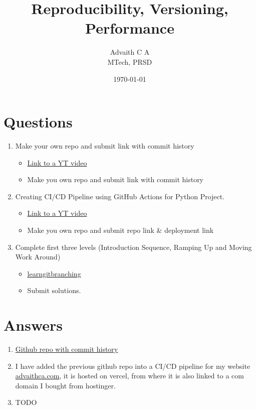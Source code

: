 \documentclass{article}
\title{Reproducibility, Versioning, Performance}
\author{Advaith C A \\MTech, PRSD}
\date{\today}
\begin{document}
    \maketitle
    \section*{Questions}
    \begin{enumerate}
        \item Make your own repo and submit link with commit history
        \begin{itemize}
            \item \href{https://www.youtube.com/watch?v=8Dd7KRpKeaE}{Link to a YT video}
            \item Make you own repo and submit link with commit history
        \end{itemize}
        \item Creating CI/CD Pipeline using GitHub Actions for Python Project.
        \begin{itemize}
            \item \href{https://www.youtube.com/watch?v=WTofttoD2xg}{Link to a YT video}
            \item Make you own repo and submit repo link \& deployment link
        \end{itemize}
        \item Complete first three levels (Introduction Sequence, Ramping Up and Moving Work Around)
        \begin{itemize}
            \item \href{https://learngitbranching.js.org/}{learngitbranching}
            \item Submit solutions.
        \end{itemize}
    \end{enumerate}

    \section*{Answers}
    \begin{enumerate}
        \item \href{https://github.com/advaithca/advaithca.github.io/tree/master}{Github repo with commit history}
        \item I have added the previous github repo into a CI/CD pipeline for my website \href{https://advaithca.com}{advaithca.com}, it is hosted on vercel, from where it is also linked to a com domain I bought from hostinger.
        \item TODO
    \end{enumerate}
\end{document}
